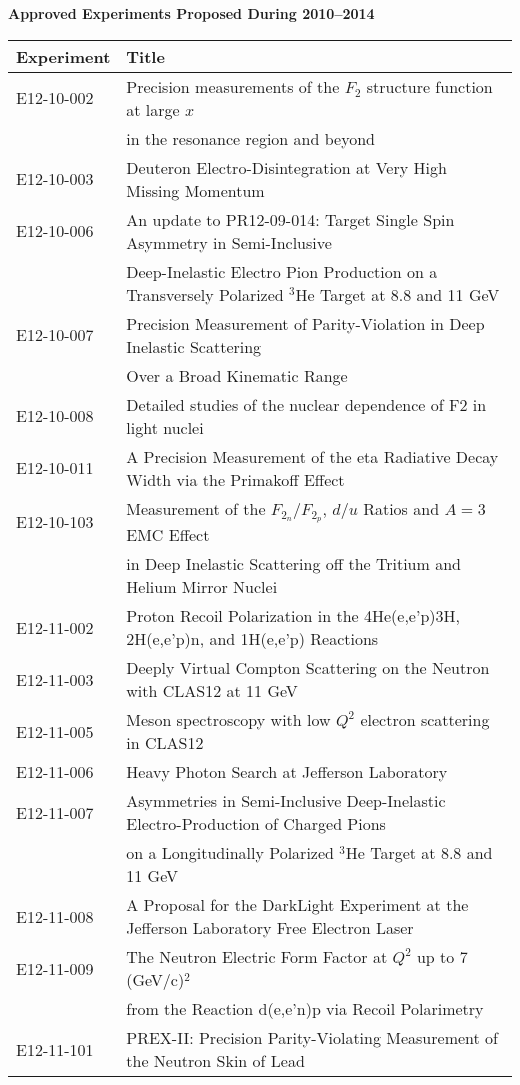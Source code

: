 \clearpage
\centerline{\bf Approved Experiments Proposed During 2010--2014}
\begin{tabular}{ll}
Experiment & Title\\
\hline
E12-10-002 & Precision measurements of the $F_2$ structure function at large $x$\\
& in the resonance region and beyond\\
E12-10-003 & Deuteron Electro-Disintegration at Very High Missing Momentum\\
E12-10-006 & An update to PR12-09-014: Target Single Spin Asymmetry in Semi-Inclusive\\
& Deep-Inelastic Electro Pion Production on a Transversely Polarized $^3$He Target at 8.8 and 11 GeV\\
E12-10-007 & Precision Measurement of Parity-Violation in Deep Inelastic Scattering\\
& Over a Broad Kinematic Range\\
E12-10-008 & Detailed studies of the nuclear dependence of F2 in light nuclei\\
E12-10-011 & A Precision Measurement of the eta Radiative Decay Width via the Primakoff Effect\\
E12-10-103 & Measurement of the $F_{2_n}/F_{2_p}$, $d/u$ Ratios and $A=3$ EMC Effect\\
& in Deep Inelastic Scattering off the Tritium and Helium Mirror Nuclei\\
E12-11-002 & Proton Recoil Polarization in the 4He(e,e'p)3H, 2H(e,e'p)n, and 1H(e,e'p) Reactions\\
E12-11-003 & Deeply Virtual Compton Scattering on the Neutron with CLAS12 at 11 GeV\\
E12-11-005 & Meson spectroscopy with low $Q^2$ electron scattering in CLAS12\\
E12-11-006 & Heavy Photon Search at Jefferson Laboratory\\
E12-11-007 & Asymmetries in Semi-Inclusive Deep-Inelastic Electro-Production of Charged Pions\\
& on a Longitudinally Polarized $^3$He Target at 8.8 and 11 GeV\\
E12-11-008 & A Proposal for the DarkLight Experiment at the Jefferson Laboratory Free Electron Laser\\
E12-11-009 & The Neutron Electric Form Factor at $Q^2$ up to 7 (GeV/c)$^2$\\
& from the Reaction d(e,e'n)p via Recoil Polarimetry\\
E12-11-101 & PREX-II: Precision Parity-Violating Measurement of the Neutron Skin of Lead\\

\end{tabular}
